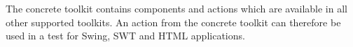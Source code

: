 
The concrete toolkit contains components and actions which are available in all other supported toolkits. An action from the concrete toolkit can therefore be used in a test for Swing, SWT and HTML applications.  
